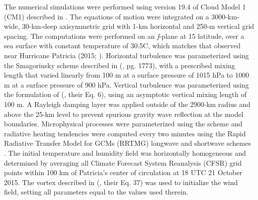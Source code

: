 The numerical simulations were performed using version 19.4 of Cloud Model 1 (CM1) described in \cite{BryanRotunno2009}.
The equations of motion were integrated on a 3000-km-wide, 30-km-deep axisymmetric grid with 1-km horizontal and 250-m vertical grid spacing.
The computations were performed on an \textit{f}-plane at 15 latitude, over a sea surface with constant temperature of 30.5\textdegree C, which matches that observed near Hurricane Patricia (2015; \citeauthor{Kimberlainetal2016} \citeyear{Kimberlainetal2016}).
Horizontal turbulence was parameterized using the Smagorinsky scheme described in \citeauthor{BryanRotunno2009} (\citeyear{BryanRotunno2009}, pg. 1773), with a prescribed mixing length that varied linearly from 100 m at a surface pressure of 1015 hPa to 1000 m at a surface pressure of 900 hPa.
Vertical turbulence was parameterized using the formulation of \citeauthor{MarkowskiBryan2016} (\citeyear{MarkowskiBryan2016}, their Eq. 6), using an asymptotic vertical mixing length of 100 m.
A Rayleigh damping layer was applied outside of the 2900-km radius and above the 25-km level to prevent spurious gravity wave reflection at the model boundaries.
Microphysical processes were parameterized using the \cite{Thompson} scheme and radiative heating tendencies were computed every two minutes using the Rapid Radiative Transfer Model for GCMs (RRTMG) longwave and shortwave schemes \citep{Iacono}.
The initial temperature and humidity field was horizontally homogeneous and determined by averaging all Climate Forecast System Reanalysis (CFSR) grid points within 100 km of Patricia's center of circulation at 18 UTC 21 October 2015.
The vortex described in \citeauthor{RotunnoEmanuel} (\citeyear{RotunnoEmanuel}, their Eq. 37) was used to initialize the wind field, setting all parameters equal to the values used therein.


